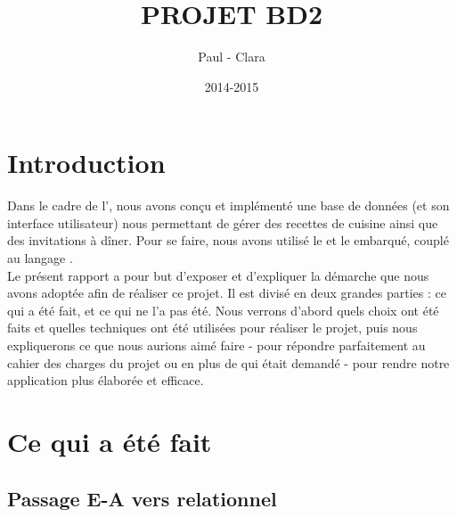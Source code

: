 \documentclass[a4paper,10pt]{report}
\title{PROJET BD2}
\date{2014-2015}
\author{Paul \bsc{Selle} - Clara \bsc{Gainon de Forsan de Gabriac}}
\begin{document}
\maketitle

\tableofcontents

\chapter{Introduction}

Dans le cadre de l', nous avons conçu et implémenté une base de données (et son interface utilisateur) nous permettant de gérer des recettes de cuisine ainsi que des invitations à dîner. Pour se faire, nous avons utilisé le  et le  embarqué, couplé au langage .\\

Le présent rapport a pour but d'exposer et d'expliquer la démarche que nous avons adoptée afin de réaliser ce projet.
Il est divisé en deux grandes parties : ce qui a été fait, et ce qui ne l'a pas été. Nous verrons d'abord quels choix ont été faits et quelles techniques ont été utilisées pour réaliser le projet, puis nous expliquerons ce que nous aurions aimé faire  - pour répondre parfaitement au cahier des charges du projet ou en plus de qui était demandé - pour rendre notre application plus élaborée et efficace.
\chapter{Ce qui a été fait}

\section{Passage E-A vers relationnel}
\end{document}
